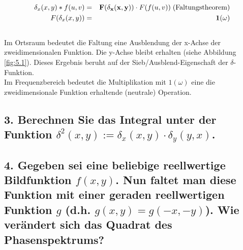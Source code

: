 \begin{eqnarray*}
\delta_{x}(x,y)*f(u,v) &=& \mathbf{F(\delta_{x}(x,y))}\cdot F(f(u,v)) \; \hbox{(Faltungstheorem)} \\
F(\delta_{x}(x,y)) &=& \mathbf{1(\omega)} \\
\end{eqnarray*}
\\
Im Ortsraum bedeutet die Faltung eine Ausblendung der x-Achse der zweidimensionalen Funktion. Die y-Achse bleibt erhalten (siehe Abbildung \ref{fig:5.1}). Dieses Ergebnis beruht auf der Sieb/Ausblend-Eigenschaft der $\delta$-Funktion. \\
Im Frequenzbereich bedeutet die Multiplikation mit $1(\omega)$ eine die zweidimensionale Funktion erhaltende (neutrale) Operation.

\subsection*{3. Berechnen Sie das Integral unter der Funktion $\delta^{2}(x,y):=\delta_{x}(x,y)\cdot\delta_{y}(y,x)$.}

\subsection*{4. Gegeben sei eine beliebige reellwertige Bildfunktion $f(x,y)$. Nun faltet man diese Funktion mit einer geraden reellwertigen Funktion $g$ (d.h. $g(x,y)=g(-x,-y)$). Wie ver\"andert sich das Quadrat des Phasenspektrums?}
